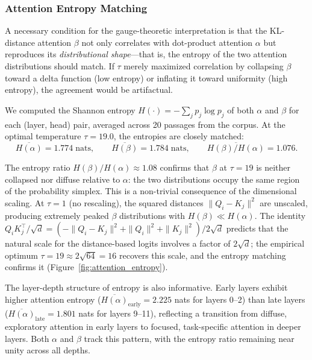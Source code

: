 \documentclass[twoside,11pt]{article}
\begin{document}
\subsubsection{Attention Entropy Matching}
\label{sec:entropy_analysis}

A necessary condition for the gauge-theoretic interpretation is that the KL-distance attention $\beta$ not only correlates with dot-product attention $\alpha$ but reproduces its \emph{distributional shape}---that is, the entropy of the two attention distributions should match. If $\tau$ merely maximized correlation by collapsing $\beta$ toward a delta function (low entropy) or inflating it toward uniformity (high entropy), the agreement would be artifactual.

We computed the Shannon entropy $H(\cdot) = -\sum_j p_j \log p_j$ of both $\alpha$ and $\beta$ for each (layer, head) pair, averaged across 20 passages from the corpus. At the optimal temperature $\tau = 19.0$, the entropies are closely matched:
\begin{equation}
\overline{H(\alpha)} = 1.774 \;\text{nats}, \qquad \overline{H(\beta)} = 1.784 \;\text{nats}, \qquad \overline{H(\beta)/H(\alpha)} = 1.076.
\end{equation}

The entropy ratio $H(\beta)/H(\alpha) \approx 1.08$ confirms that $\beta$ at $\tau = 19$ is neither collapsed nor diffuse relative to $\alpha$: the two distributions occupy the same region of the probability simplex. This is a non-trivial consequence of the dimensional scaling. At $\tau = 1$ (no rescaling), the squared distances $\|Q_i - K_j\|^2$ are unscaled, producing extremely peaked $\beta$ distributions with $H(\beta) \ll H(\alpha)$. The identity $Q_i K_j^\top / \sqrt{d} = (-\|Q_i - K_j\|^2 + \|Q_i\|^2 + \|K_j\|^2)/2\sqrt{d}$ predicts that the natural scale for the distance-based logits involves a factor of $2\sqrt{d}$; the empirical optimum $\tau = 19 \approx 2\sqrt{64} = 16$ recovers this scale, and the entropy matching confirms it (Figure~\ref{fig:attention_entropy}).

The layer-depth structure of entropy is also informative. Early layers exhibit higher attention entropy ($\overline{H(\alpha)}_{\text{early}} = 2.225$ nats for layers 0--2) than late layers ($\overline{H(\alpha)}_{\text{late}} = 1.801$ nats for layers 9--11), reflecting a transition from diffuse, exploratory attention in early layers to focused, task-specific attention in deeper layers. Both $\alpha$ and $\beta$ track this pattern, with the entropy ratio remaining near unity across all depths.
\end{document}
